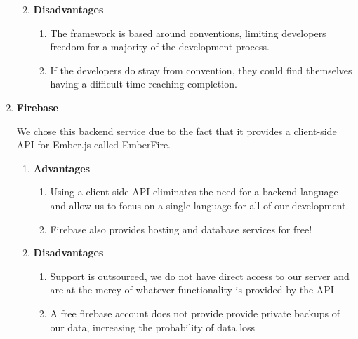 \begin{enumerate}
\begin{enumerate}
\begin{enumerate}
\end{enumerate}
\item \textbf{Disadvantages}
\begin{enumerate}
\item The framework is based around conventions, limiting developers freedom for a majority of the development process.
\item If the developers do stray from convention, they could find themselves having a difficult time reaching completion.
\end{enumerate}
\end{enumerate}
\item \textbf{Firebase} \par We chose this backend service due to the fact that it provides a client-side API for Ember.js called EmberFire.
\begin{enumerate}
\item \textbf{Advantages}
\begin{enumerate}
\item Using a client-side API eliminates the need for a backend language and allow us to focus on a single language for all of our development.
\item Firebase also provides hosting and database services for free!
\end{enumerate}
\item \textbf{Disadvantages}
\begin{enumerate}
\item Support is outsourced, we do not have direct access to our server and are at the mercy of whatever functionality is provided by the API
\item A free firebase account does not provide provide private backups of our data, increasing the probability of data loss
\end{enumerate}
\end{enumerate}

\end{enumerate}
